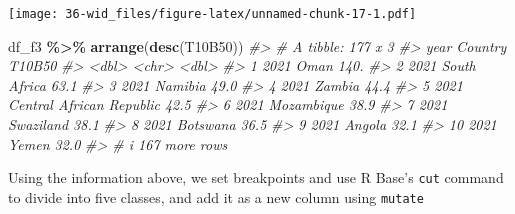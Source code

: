 \documentclass[
  xelatex, ja=standard]{bxjsbook}
\newenvironment{Shaded}{\begin{snugshade}}{\end{snugshade}}
\newcommand{\CommentTok}[1]{\textcolor[rgb]{0.56,0.35,0.01}{\textit{#1}}}
\newcommand{\FunctionTok}[1]{\textcolor[rgb]{0.13,0.29,0.53}{\textbf{#1}}}
\newcommand{\NormalTok}[1]{#1}
\newcommand{\SpecialCharTok}[1]{\textcolor[rgb]{0.81,0.36,0.00}{\textbf{#1}}}
\theoremstyle{definition}
\theoremstyle{definition}
\theoremstyle{definition}
\theoremstyle{definition}
\theoremstyle{remark}
\begin{document}
\texttt{[image: 36-wid\_files/figure-latex/unnamed-chunk-17-1.pdf]}

\begin{Shaded}
\begin{Highlighting}[]
\NormalTok{df\_f3 }\SpecialCharTok{\%\textgreater{}\%} \FunctionTok{arrange}\NormalTok{(}\FunctionTok{desc}\NormalTok{(T10B50))}
\CommentTok{\#\textgreater{} \# A tibble: 177 x 3}
\CommentTok{\#\textgreater{}     year Country                  T10B50}
\CommentTok{\#\textgreater{}    \textless{}dbl\textgreater{} \textless{}chr\textgreater{}                     \textless{}dbl\textgreater{}}
\CommentTok{\#\textgreater{}  1  2021 Oman                      140. }
\CommentTok{\#\textgreater{}  2  2021 South Africa               63.1}
\CommentTok{\#\textgreater{}  3  2021 Namibia                    49.0}
\CommentTok{\#\textgreater{}  4  2021 Zambia                     44.4}
\CommentTok{\#\textgreater{}  5  2021 Central African Republic   42.5}
\CommentTok{\#\textgreater{}  6  2021 Mozambique                 38.9}
\CommentTok{\#\textgreater{}  7  2021 Swaziland                  38.1}
\CommentTok{\#\textgreater{}  8  2021 Botswana                   36.5}
\CommentTok{\#\textgreater{}  9  2021 Angola                     32.1}
\CommentTok{\#\textgreater{} 10  2021 Yemen                      32.0}
\CommentTok{\#\textgreater{} \# i 167 more rows}
\end{Highlighting}
\end{Shaded}

Using the information above, we set breakpoints and use R Base's \texttt{cut} command to divide into five classes, and add it as a new column using \texttt{mutate}
\end{document}
